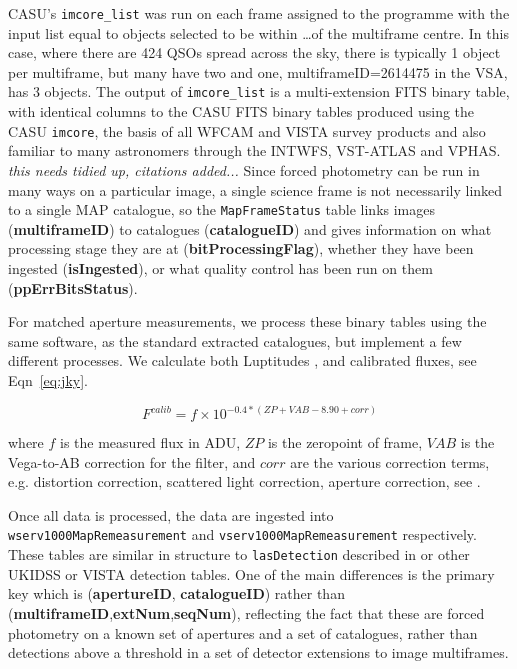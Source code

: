 \documentclass[usenatbib]{mnras}
\begin{document}
    CASU's \verb+imcore_list+ was run on each frame assigned to the programme with
    the input list equal to objects selected to be within \ldots of the multiframe
    centre. In this case, where there are 424 QSOs spread across the sky, there is
    typically 1 object per multiframe, but many have two and one,
    multiframeID=2614475 in the VSA, has 3 objects. The output of \verb+imcore_list+
    is a multi-extension FITS binary table, with identical columns to the CASU FITS
    binary tables produced using the CASU \verb+imcore+, the basis of all WFCAM and
    VISTA survey products and also familiar to many astronomers through the INTWFS, 
    VST-ATLAS and VPHAS.     {\it this needs tidied up, citations added...}
    Since forced photometry can be run
    in many ways on a particular image, a single science frame is not
    necessarily linked to a single MAP catalogue, so the \verb+MapFrameStatus+ table
    links images ({\bf multiframeID}) to catalogues ({\bf catalogueID}) and gives
    information on what processing stage they are at ({\bf bitProcessingFlag}),
    whether they have been ingested ({\bf isIngested}), or what quality control has
    been run on them ({\bf ppErrBitsStatus}).
    
    For matched aperture measurements, we process these binary tables using the same
    software, as the standard extracted catalogues, but implement a few different
    processes. We calculate both Luptitudes \citep{Luptitudes}, and calibrated fluxes,
    see Eqn~\ref{eq:jky}. 
    
    \begin{equation}
      F^{calib} = f\times10^{-0.4*(ZP+VAB-8.90+corr)} 
      \label{eq:jky}
    \end{equation}
    
    \noindent where $f$ is the measured flux in ADU, $ZP$ is the zeropoint of
    frame, $VAB$ is the Vega-to-AB correction for the filter, and $corr$ are the
    various correction terms, e.g. distortion correction, scattered light
    correction, aperture correction, see \citep{Hambly2008, Cross2012}. 
    
    Once all data is processed, the data are ingested into
    \verb+wserv1000MapRemeasurement+ and \verb+vserv1000MapRemeasurement+
    respectively. These tables are similar in structure to \verb+lasDetection+
    described in \citep{Hambly2008} or other UKIDSS or VISTA detection tables. One of
    the main differences is the primary key which is ({\bf apertureID},{\bf
      catalogueID}) rather than ({\bf multiframeID},{\bf extNum},{\bf seqNum}),
    reflecting the fact that these are forced photometry on a known set of apertures
    and a set of catalogues, rather than detections above a threshold in a set of
    detector extensions to image multiframes.
    
\end{document}
